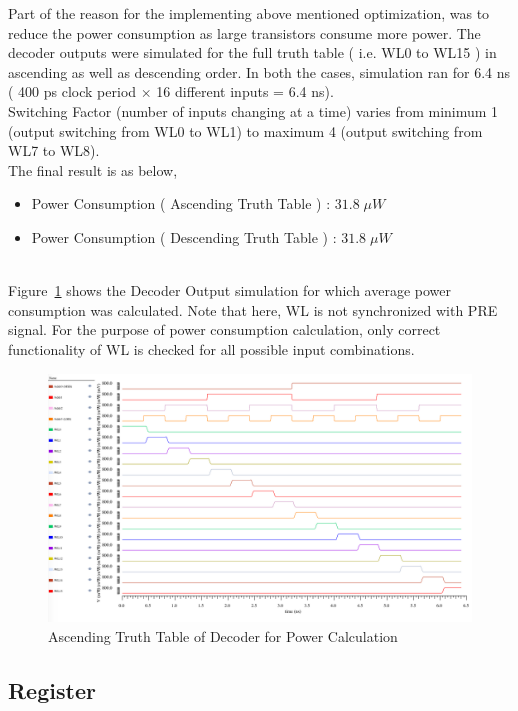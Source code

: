 \documentclass[10pt,letterpaper,onecolumn]{article}
\begin{document}
Part of the reason for the implementing above mentioned optimization, was to reduce the power consumption as large transistors consume more power. The decoder outputs were simulated for the full truth table ( i.e. WL0 to WL15 ) in ascending as well as descending order. In both the cases, simulation ran for 6.4 ns ( 400 ps clock period $\times$ 16 different inputs = 6.4 ns). \\
Switching Factor (number of inputs changing at a time) varies from minimum 1 (output switching from WL0 to WL1) to maximum 4 (output switching from WL7 to WL8). \\ 
The final result is as below,
\begin{itemize}
  \item Power Consumption ( Ascending Truth Table ) : $31.8 \; \mu W$
  \item Power Consumption ( Descending Truth Table ) : $31.8 \; \mu W$
\end{itemize} \\
Figure~\ref{fig:DecoderTruthTable} shows the Decoder Output simulation for which average power consumption was calculated. Note that here, WL is not synchronized with PRE signal. For the purpose of power consumption calculation, only correct functionality of WL is checked for all possible input combinations. 

\begin{figure}[h!]
\centering
\includegraphics[scale=0.4]{DecoderTruthTableAscending.png}
\caption{Ascending Truth Table of Decoder for Power Calculation}
\label{fig:DecoderTruthTable}
\end{figure}


\subsection{Register}
\end{document}
